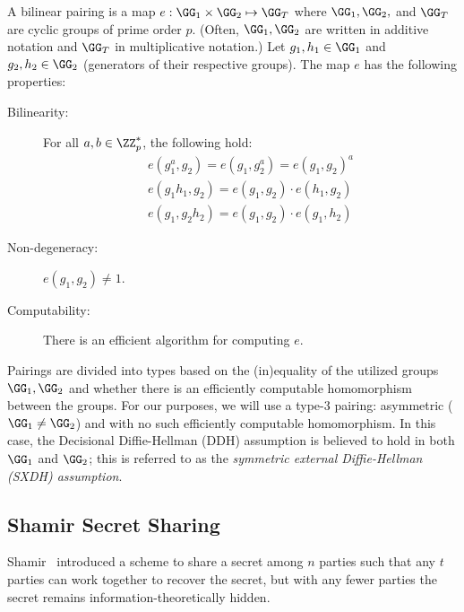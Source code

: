 \begin{definition}
   A bilinear pairing is a map $e : \GG_1 \times \GG_2 \mapsto \GG_T$ where $\GG_1, \GG_2,$ and $\GG_T$ are cyclic groups of prime order $p$. (Often, $\GG_1,\GG_2$ are written in additive notation and $\GG_T$ in multiplicative notation.) Let $g_1,h_1 \in \GG_1$ and $g_2,h_2 \in \GG_2$ (generators of their respective groups). The map $e$ has the following properties:
   \begin{description}
       \item[Bilinearity:] For all $a,b \in \ZZ_p^*$, the following hold:
       \begin{align*}
           e(g_1^a, g_2) = e(g_1, g_2^a) = e(g_1, g_2)^a\\
           e(g_1 h_1, g_2) = e(g_1, g_2) \cdot e(h_1, g_2)\\
           e(g_1, g_2 h_2) = e(g_1, g_2) \cdot e(g_1, h_2)
        \end{align*}
        \item[Non-degeneracy:] $e(g_1, g_2) \neq 1$.
        \item[Computability:] There is an efficient algorithm for computing $e$.
    \end{description}
\end{definition}

Pairings are divided into types based on the (in)equality of the utilized groups $\GG_1,\GG_2$ and whether there is an efficiently computable homomorphism between the groups. For our purposes, we will use a type-3 pairing: asymmetric ($\GG_1 \neq \GG_2$) and with no such efficiently computable homomorphism. In this case, the Decisional Diffie-Hellman (DDH) assumption is believed to hold in both $\GG_1$ and $\GG_2$; this is referred to as the \emph{symmetric external Diffie-Hellman (SXDH) assumption}.

\subsection{Shamir Secret Sharing}\label{sec:shamir}
Shamir~\cite{CACM:Shamir79} introduced a scheme to share a secret among $n$ parties such that any $t$ parties can work together to recover the secret, but with any fewer parties the secret remains information-theoretically hidden.

